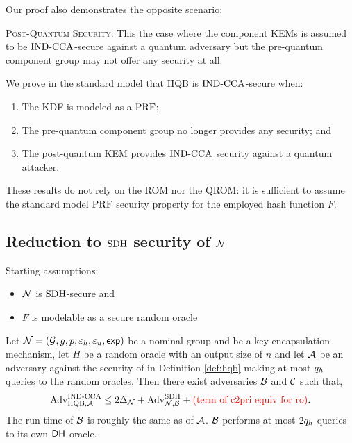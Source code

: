 \documentclass{article}
\begin{document}
        Our proof also demonstrates the opposite scenario:

        \medskip \noindent
        \textsc{Post-Quantum Security:} This the case where the component
        KEMs is assumed to be $\text{IND-CCA}$-secure against a quantum adversary but the
        pre-quantum component group may not offer any security at all.

        We prove in the standard model that HQB is $\text{IND-CCA}$-secure when:
        \begin{enumerate}
        \item The KDF is modeled as a $\text{PRF}$;
        \item The pre-quantum component group no longer provides any security; and
        \item The post-quantum KEM provides $\text{IND-CCA}$ security against a quantum attacker.
        \end{enumerate}

        These results do not rely on the ROM nor the QROM: it is sufficient to assume
        the standard model $\text{PRF}$ security property for the employed hash function
        $F$.

        \subsection{Reduction to $\text{SDH}$ security of $\mathcal{N}$}

        Starting assumptions:

        \begin{itemize}
        \item $\mathcal{N}$ is $\text{SDH}$-secure and
        \item $F$ is modelable as a secure random oracle
        \end{itemize}


        \begin{theorem}
            \label{theorem:sdh_kem-coll_imply_hqb}
            Let $\mathcal{N} = (\mathcal{G}, g, p, \varepsilon_h , \varepsilon_u , \textsf{exp})$ be a nominal group and \kem be a key encapsulation mechanism, let $H$ be a random oracle with an output size of $n$ and let $\mathcal{A}$ be an adversary against the \cca security of \hqb in Definition \ref{def:hqb} making at most $q_h$ queries to the random oracles.
            Then there exist adversaries $\mathcal{B}$ and $\mathcal{C}$ such that,
            \[ \text{Adv}_{\text{HQB}, \mathcal{A}}^{\text{IND-CCA}} \leq 2 \Delta_{\mathcal{N}} +  \text{Adv}_{\mathcal{N}, \mathcal{B}}^{\text{SDH}} + \text{\textcolor{red}{(term of c2pri equiv for ro)}}. \]
            The run-time of $\mathcal{B}$ is roughly the same as of $\mathcal{A}$.
            $\mathcal{B}$ performs at most $2 q_h$ queries to its own $\textsf{DH}$ oracle.
        \end{theorem}
\end{document}
